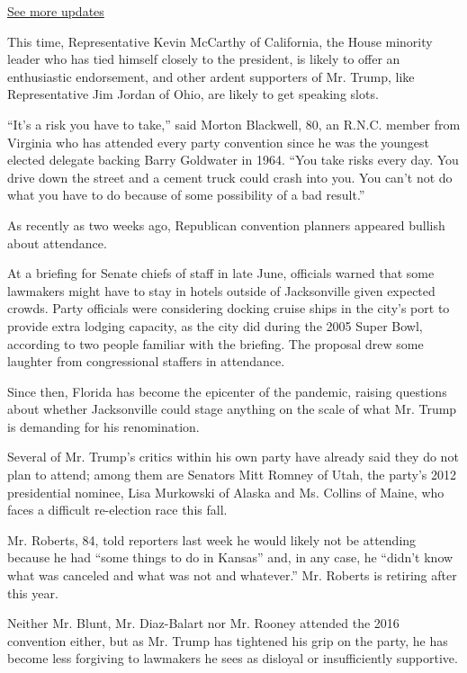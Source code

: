 \href{https://www.nytimes.com/2020/08/04/us/elections/primary-election-michigan-arizona-kansas.html?action=click\&pgtype=Article\&state=default\&region=MAIN_CONTENT_1\&context=storylines_live_updates}{See
more updates}

This time, Representative Kevin McCarthy of California, the House
minority leader who has tied himself closely to the president, is likely
to offer an enthusiastic endorsement, and other ardent supporters of Mr.
Trump, like Representative Jim Jordan of Ohio, are likely to get
speaking slots.

``It's a risk you have to take,'' said Morton Blackwell, 80, an R.N.C.
member from Virginia who has attended every party convention since he
was the youngest elected delegate backing Barry Goldwater in 1964. ``You
take risks every day. You drive down the street and a cement truck could
crash into you. You can't not do what you have to do because of some
possibility of a bad result.''

As recently as two weeks ago, Republican convention planners appeared
bullish about attendance.

At a briefing for Senate chiefs of staff in late June, officials warned
that some lawmakers might have to stay in hotels outside of Jacksonville
given expected crowds. Party officials were considering docking cruise
ships in the city's port to provide extra lodging capacity, as the city
did during the 2005 Super Bowl, according to two people familiar with
the briefing. The proposal drew some laughter from congressional
staffers in attendance.

Since then, Florida has become the epicenter of the pandemic, raising
questions about whether Jacksonville could stage anything on the scale
of what Mr. Trump is demanding for his renomination.

Several of Mr. Trump's critics within his own party have already said
they do not plan to attend; among them are Senators Mitt Romney of Utah,
the party's 2012 presidential nominee, Lisa Murkowski of Alaska and Ms.
Collins of Maine, who faces a difficult re-election race this fall.

Mr. Roberts, 84, told reporters last week he would likely not be
attending because he had ``some things to do in Kansas'' and, in any
case, he ``didn't know what was canceled and what was not and
whatever.'' Mr. Roberts is retiring after this year.

Neither Mr. Blunt, Mr. Diaz-Balart nor Mr. Rooney attended the 2016
convention either, but as Mr. Trump has tightened his grip on the party,
he has become less forgiving to lawmakers he sees as disloyal or
insufficiently supportive.

